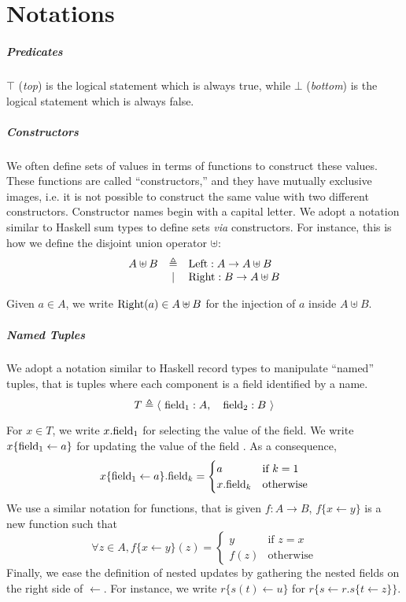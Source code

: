 \chapter{Notations}
\label{frontmatter:notations}

\paragraph{Predicates}
%
\( \top \) (\emph{top}) is the logical statement which is always true, while \(
\bot \) (\emph{bottom}) is the logical statement which is always false.

\paragraph{Constructors}
%
We often define sets of values in terms of functions to construct these values.
%
These functions are called ``constructors,'' and they have mutually exclusive
images, i.e. it is not possible to construct the same value with two different
constructors.
%
Constructor names begin with a capital letter.
%
We adopt a notation similar to Haskell sum types to define sets \emph{via}
constructors.
%
For instance, this is how we define the disjoint union operator $\uplus$:
%
\[
  \begin{array}{rcl}
    A \uplus B & \triangleq & \mathrm{Left} : A \rightarrow A \uplus B \\
               & |          & \mathrm{Right} : B \rightarrow A \uplus B
  \end{array}
\]

Given $a \in A$, we write $\mathrm{Right}(a) \in A \uplus B$ for the injection of
$a$ inside $A \uplus B$.

\paragraph{Named Tuples}
%
We adopt a notation similar to Haskell record types to manipulate ``named''
tuples, that is tuples where each component is a field identified by a name.
%
\[
  T \triangleq \langle~\mathrm{field_1} : A,\quad\mathrm{field_2} : B~\rangle
\]

For $x \in T$, we write $x.\mathrm{field_1}$ for selecting the value of the
 field. We write $x \{ \mathrm{field_1} \leftarrow a \}$ for
updating the value of the field . As a consequence,
%
\[
  x \{ \mathrm{field_1} \leftarrow a \}.\mathrm{field}_k = \begin{cases}
    a & \text{if } k = 1 \\
    x.\mathrm{field}_k & \text{otherwise}
  \end{cases}
\]
%
We use a similar notation for functions, that is given
\( f : A \rightarrow B \), \( f \{ x \leftarrow y \} \) is a new function such
that
%
\[
  \forall z \in A, f \{ x \leftarrow y \}(z) = \begin{cases}
    y & \text{if } z = x \\
    f(z) & \text{otherwise}
  \end{cases}
\]
%
Finally, we ease the definition of nested updates by gathering the nested fields
on the right side of \( \leftarrow \).
%
For instance, we write \( r \{ s(t) \leftarrow u \} \) for
\( r \{ s \leftarrow r.s \{ t \leftarrow z \} \} \).
